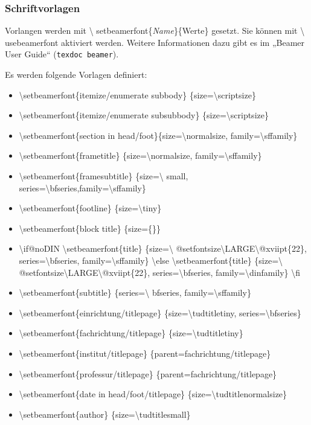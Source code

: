 \documentclass[presentation,t]{beamer}
\begin{document}
\begin{frame}[allowframebreaks]
\frametitle{Schriftvorlagen}
\label{sec-2-3-3}

Vorlangen werden mit \textbackslash
setbeamerfont\{\emph{Name}\}\{Werte\} gesetzt. Sie können mit \textbackslash
usebeamerfont aktiviert werden. Weitere Informationen dazu gibt es im
„Beamer User Guide“ (\texttt{texdoc beamer}).

Es werden folgende Vorlagen definiert:
\begin{itemize}
\item \textbackslash setbeamerfont\{itemize/enumerate subbody\} \{size=\textbackslash scriptsize\}
\item \textbackslash setbeamerfont\{itemize/enumerate subsubbody\} \{size=\textbackslash scriptsize\}
\item \textbackslash setbeamerfont\{section in head/foot\}\{size=\textbackslash normalsize, family=\textbackslash sffamily\}
\item \textbackslash setbeamerfont\{frametitle\} \{size=\textbackslash normalsize, family=\textbackslash sffamily\}
\item \textbackslash setbeamerfont\{framesubtitle\} \{size=\textbackslash
   small, series=\textbackslash bfseries,family=\textbackslash sffamily\}
\item \textbackslash setbeamerfont\{footline\} \{size=\textbackslash tiny\}
\item \textbackslash setbeamerfont\{block title\} \{size=\{\}\}
\item \textbackslash if@noDIN
    \textbackslash setbeamerfont\{title\} \{size=\textbackslash
   @setfontsize\textbackslash LARGE\textbackslash @xviipt\{22\},
   series=\textbackslash bfseries, family=\textbackslash sffamily\}
  \textbackslash else
    \textbackslash setbeamerfont\{title\} \{size=\textbackslash
   @setfontsize\textbackslash LARGE\textbackslash @xviipt\{22\},
   series=\textbackslash bfseries, family=\textbackslash dinfamily\}
  \textbackslash fi
\item \textbackslash setbeamerfont\{subtitle\} \{series=\textbackslash
   bfseries, family=\textbackslash sffamily\}
\item \textbackslash setbeamerfont\{einrichtung/titlepage\}
   \{size=\textbackslash tudtitletiny, series=\textbackslash bfseries\}
\item \textbackslash setbeamerfont\{fachrichtung/titlepage\} \{size=\textbackslash tudtitletiny\}
\item \textbackslash setbeamerfont\{institut/titlepage\} \{parent=fachrichtung/titlepage\}
\item \textbackslash setbeamerfont\{professur/titlepage\} \{parent=fachrichtung/titlepage\}
\item \textbackslash setbeamerfont\{date in head/foot/titlepage\} \{size=\textbackslash tudtitlenormalsize\}
\item \textbackslash setbeamerfont\{author\} \{size=\textbackslash tudtitlesmall\}
\end{itemize}
\end{frame}
\end{document}

